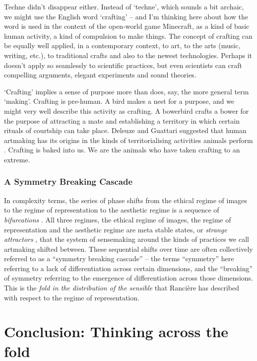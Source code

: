 \documentclass[letterpaper]{article}
\begin{document}
    Techne didn't disappear either. Instead of ‘techne’, which sounds a bit archaic, we might use the English word ‘crafting’ – and I'm thinking here about how the word is used in the context of the open-world game Minecraft, as a kind of basic human activity, a kind of compulsion to make things. The concept of crafting can be equally well applied, in a contemporary context, to art, to the arts (music, writing, etc.), to traditional crafts and also to the newest technologies. Perhaps it doesn't apply so seamlessly to scientific practices, but even scientists can craft compelling arguments, elegant experiments and sound theories.

    ‘Crafting’ implies a sense of purpose more than does, say, the more general term ‘making’. Crafting is pre-human. A bird makes a nest for a purpose, and we might very well describe this activity as crafting. A bowerbird crafts a bower for the purpose of attracting a mate and establishing a territory in which certain rituals of courtship can take place. Deleuze and Guattari suggested that human artmaking has its origins in the kinds of territorialising activities animals perform \citep[p.15]{GuattariChsmss1995}. Crafting is baked into us. We are the animals who have taken crafting to an extreme.
    
    \subsubsection{A Symmetry Breaking Cascade}

    In complexity terms, the series of phase shifts from the ethical regime of images to the regime of representation to the aesthetic regime is a sequence of \emph{bifurcations} \citep{LandauThryOfPhstrnstns1936}. All three regimes, the ethical regime of images, the regime of representation and the aesthetic regime are meta stable states, or \emph{strange attractors} \citep{RuelleTakensOnThNtrOfTrblnc1971}, that the system of sensemaking around the kinds of practices we call artmaking shifted between. These sequential shifts over time are often collectively referred to as a “symmetry breaking cascade” – the terms “symmetry” here referring to a lack of differentiation across certain dimensions, and the “breaking” of symmetry referring to the emergence of differentiation across those dimensions. This is the \emph{fold in the distribution of the sensible} that Rancière has described with respect to the regime of representation.

\section{Conclusion: Thinking across the fold}
\end{document}
